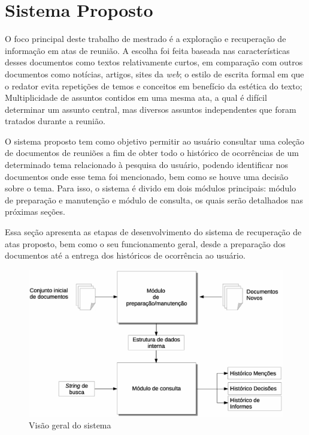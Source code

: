 \chapter{Sistema Proposto}\label{cap3}



O foco principal deste trabalho de mestrado é a exploração e recuperação de informação em atas de reunião. A escolha foi feita baseada nas características desses documentos como textos relativamente curtos, em comparação com outros documentos como notícias, artigos, sites da \textit{web}; o estilo de escrita formal em que o redator evita repetições de temos e conceitos em benefício da estética do texto; Multiplicidade de assuntos contidos em uma mesma ata, a qual é difícil determinar um assunto central, mas diversos assuntos independentes que foram tratados durante a reunião.

O sistema proposto tem como objetivo permitir ao usuário consultar uma coleção de documentos de reuniões a fim de obter todo o histórico de ocorrências de um determinado tema relacionado à pesquisa do usuário, podendo identificar nos documentos onde esse tema foi mencionado, bem como se houve uma decisão sobre o tema. Para isso, o sistema é divido em dois módulos principais: módulo de preparação e manutenção e módulo de consulta, os quais serão detalhados nas próximas seções.  %

Essa seção apresenta as etapas de desenvolvimento do sistema de recuperação de atas proposto, bem como o seu funcionamento geral, desde a preparação dos documentos até a entrega dos históricos de ocorrência ao usuário. 

  \begin{figure}[!h]
	  \centering
	  \includegraphics[width=0.69\paperwidth]{conteudo/capitulos/figs/visao-geral-3.eps}
	  \caption{Visão geral do sistema}
	  \label{fig:visao-geral}
  \end{figure}

